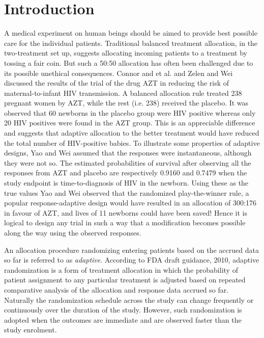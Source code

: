 \section{Introduction}
A medical experiment on human beings should
be aimed to provide best possible care for the individual patients.
Traditional balanced treatment allocation, in the two-treatment set up, suggests allocating incoming patients to a treatment by tossing a fair coin. But such a 50:50 allocation has often been challenged due to its possible
unethical consequences. Connor and et al.\cite{1} and Zelen and Wei\cite{2} discussed the results of the trial of the drug AZT in reducing the risk of maternal-to-infant HIV transmission. A balanced allocation rule treated 238 pregnant women by AZT, while the rest (i.e. 238) received the placebo. It was observed that 60 newborns in the placebo group were
HIV positive whereas only 20 HIV positives were found in the AZT group. This is an appreciable difference and suggests that adaptive allocation to the better treatment would have reduced the total number of HIV-positive babies. To illustrate some properties of adaptive designs, Yao and Wei\cite{3} assumed that the responses were instantaneous, although they were not so. The estimated probabilities of survival after observing all the responses from AZT and placebo are respectively 0.9160 and 0.7479 when the study endpoint is time-to-diagnosis of HIV in the newborn. Using these as the true values Yao and Wei\cite{3} observed that the randomized play-the-winner rule\cite{4}, a popular response-adaptive design would have resulted in an allocation of 300:176 in favour of AZT, and lives of 11 newborns could have been saved! Hence it is logical to design any trial in such a way that a modification becomes possible along the way using the observed responses.

An allocation procedure randomizing  entering patients based on the accrued data so far is referred to as \textit{adaptive}. According to FDA draft guidance, 2010, adaptive randomization is a form of treatment allocation in which the probability of patient assignment to any particular treatment is adjusted based on repeated comparative analysis of the allocation and response data  accrued so far. Naturally the randomization schedule across the study can change frequently or continuously over the duration of the study. However, such randomization is adopted when the outcomes are immediate and  are observed faster than the study enrolment.

